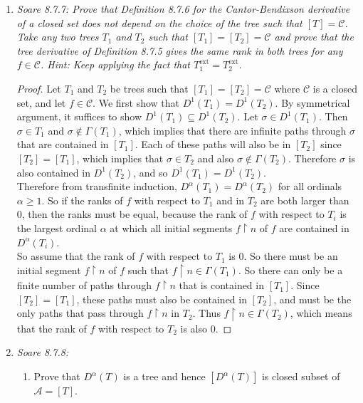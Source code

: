 \documentclass{article}
\begin{document}
\begin{enumerate}[label={\bf Q\arabic*:}]
  \item \it Soare 8.7.7: Prove that Definition 8.7.6 for the
    Cantor-Bendixson derivative of a closed set does not depend on the
    choice of the tree such that $[T]=\mathcal{C}$. Take any two trees
    $T_1$ and $T_2$ such that $[T_1]=[T_2]=\mathcal{C}$ and prove that the
    tree derivative of Definition 8.7.5 gives the same rank in both trees
    for any $f\in\mathcal{C}$. Hint: Keep applying the fact that
    $T_1^{\text{ext}}=T_2^{\text{ext}}$.

    \begin{proof}
      Let $T_1$ and $T_2$ be trees such that $[T_1]=[T_2]=\mathcal{C}$
      where $\mathcal{C}$ is a closed set, and let $f\in\mathcal{C}$.
      We first show that $D^1(T_1)=D^1(T_2)$. By symmetrical argument, it
      suffices to show $D^1(T_1)\subseteq D^1(T_2)$. Let $\sigma\in
      D^1(T_1)$. Then $\sigma\in T_1$ and $\sigma\not\in\Gamma(T_1)$, which
      implies that there are infinite paths through $\sigma$ that are
      contained in $[T_1]$. Each of these paths will also be in $[T_2]$
      since $[T_2]=[T_1]$, which implies that $\sigma\in T_2$ and also
      $\sigma\not\in\Gamma(T_2)$. Therefore $\sigma$ is also contained in
      $D^1(T_2)$, and so $D^1(T_1)=D^1(T_2)$.  \\

      Therefore from transfinite induction, $D^\alpha(T_1)=D^\alpha(T_2)$
      for all ordinals $\alpha\geq1$. So if the ranks of $f$ with respect
      to $T_1$ and in $T_2$ are both larger than 0, then the ranks
      must be equal, because the rank of $f$ with respect to $T_i$ is the
      largest ordinal $\alpha$ at which all initial segments $f\restriction
      n$ of $f$ are contained in $D^\alpha(T_i)$. \\

      So assume that the rank of $f$ with respect to $T_1$ is 0. So there
      must be an initial segment $f\restriction n$ of $f$ such that
      $f\restriction n \in\Gamma(T_1)$. So there can only be a finite
      number of paths through $f\restriction n$ that is contained in
      $[T_1]$. Since $[T_2]=[T_1]$, these paths must also be contained in
      $[T_2]$, and must be the only paths that pass through $f\restriction
      n$ in $T_2$. Thus $f\restriction n \in\Gamma(T_2)$, which means that
      the rank of $f$ with respect to $T_2$ is also 0.
    \end{proof}

  \item \it Soare 8.7.8:
    \begin{enumerate}[label={(\roman*)}]
      \item Prove that $D^\alpha(T)$ is a tree and hence $[D^\alpha(T)]$ is
        closed subset of $\mathcal{A}=[T]$.


\end{enumerate}
\end{enumerate}
\end{document}
